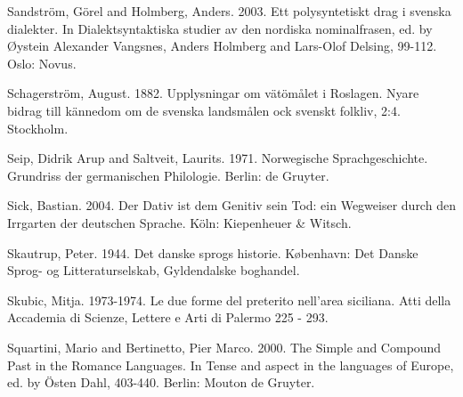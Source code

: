 \begin{styleBodytextC}
Sandström, Görel and Holmberg, Anders. 2003. Ett polysyntetiskt drag i svenska dialekter. In Dialektsyntaktiska studier av den nordiska nominalfrasen, ed. by Øystein Alexander Vangsnes, Anders Holmberg and Lars-Olof Delsing, 99-112. Oslo: Novus.

\end{styleBodytextC}

\begin{styleBodytextC}
Schagerström, August. 1882. Upplysningar om vätömålet i Roslagen. Nyare bidrag till kännedom om de svenska landsmålen ock svenskt folkliv, 2:4. Stockholm.

\end{styleBodytextC}

\begin{styleBodytextC}
Seip, Didrik Arup and Saltveit, Laurits. 1971. Norwegische Sprachgeschichte. Grundriss der germanischen Philologie. Berlin: de Gruyter.

\end{styleBodytextC}

\begin{styleBodytextC}
Sick, Bastian. 2004. Der Dativ ist dem Genitiv sein Tod: ein Wegweiser durch den Irrgarten der deutschen Sprache. Köln: Kiepenheuer \& Witsch.

\end{styleBodytextC}

\begin{styleBodytextC}
Skautrup, Peter. 1944. Det danske sprogs historie. København: Det Danske Sprog- og Litteraturselskab, Gyldendalske boghandel.

\end{styleBodytextC}

\begin{styleBodytextC}
Skubic, Mitja. 1973-1974. Le due forme del preterito nell'area siciliana. Atti della Accademia di Scienze, Lettere e Arti di Palermo 225 - 293.

\end{styleBodytextC}

\begin{styleBodytextC}
Squartini, Mario and Bertinetto, Pier Marco. 2000. The Simple and Compound Past in the Romance Languages. In Tense and aspect in the languages of Europe, ed. by Östen Dahl, 403-440. Berlin: Mouton de Gruyter.

\end{styleBodytextC}

